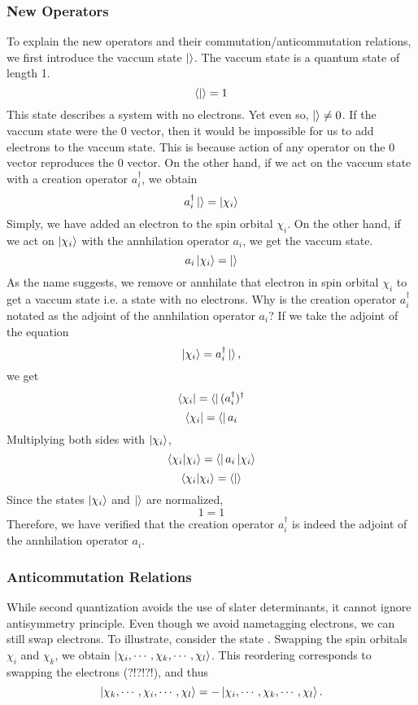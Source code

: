 \documentclass{article}
\newcommand{\adag}{a^\dagger}
\begin{document}
    \subsubsection{New Operators}
    To explain the new operators and their commutation/anticommutation
    relations, we first introduce the vaccum state \(\ket{}\). The vaccum
    state is a quantum state of length 1.
    \[\bra{}\ket{} = 1\]
    This state describes a system with no electrons. Yet even so,
    \(\ket{} \neq 0\). If the vaccum state were the 0 vector, then it would
    be impossible for us to add electrons to the vaccum state. This is because
    action of any operator on the 0 vector reproduces the 0 vector. On the
    other hand, if we act on the vaccum state with a creation operator
    \(\adag_i\), we obtain
    \[\adag_i\ket{} = \ket{\chi_i}\]
    Simply, we have added an electron to the spin orbital \(\chi_i\). On the
    other hand, if we act on \(\ket{\chi_i}\) with the annhilation operator
    \(a_i\), we get the vaccum state.
    \[a_i\ket{\chi_i} = \ket{}\]
    As the name suggests, we remove or annhilate that electron in spin
    orbital \(\chi_i\) to get a vaccum state i.e. a state with no electrons.
    Why is the creation operator \(\adag_i\) notated as the adjoint of
    the annhilation operator \(a_i\)? If we take the adjoint of the equation
    \[\ket{\chi_i} = \adag_i\ket{},\]
    we get
    \[\bra{\chi_i} = \bra{}(\adag_i)^{\dagger}\]
    \[\bra{\chi_i} = \bra{}a_i\]
    Multiplying both sides with \(\ket{\chi_i}\),
    \[\bra{\chi_i}\ket{\chi_i} = \bra{}a_i\ket{\chi_i}\]
    \[\bra{\chi_i}\ket{\chi_i} = \bra{}\ket{}\]
    Since the states \(\ket{\chi_i}\) and \(\ket{}\) are normalized,
    \[1=1\]
    Therefore, we have verified that the creation operator \(\adag_i\)
    is indeed the adjoint of the annhilation operator \(a_i\).
    \subsubsection{Anticommutation Relations}
    While second quantization avoids the use of slater determinants,
    it cannot ignore antisymmetry principle. Even though we avoid
    nametagging electrons, we can still swap electrons. To illustrate,
    consider the state .
    Swapping the spin orbitals \(\chi_i\) and \(\chi_k\), we obtain
    \(\ket{\chi_i, \cdots, \chi_k, \cdots, \chi_l}\). This reordering
    corresponds to swapping the electrons (?!?!?!), and thus
    \[\ket{\chi_k, \cdots, \chi_i, \cdots, \chi_l} =
     -\ket{\chi_i, \cdots, \chi_k, \cdots, \chi_l}.\]
\end{document}
